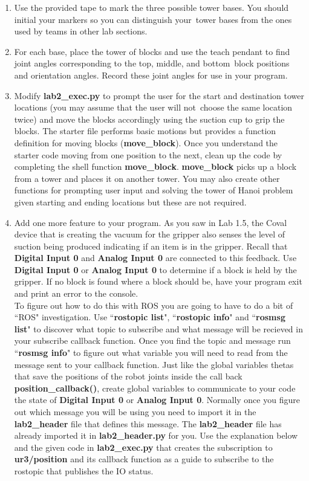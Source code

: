 \begin{enumerate}
\item Use the provided tape to mark the three possible tower bases.  You should initial your markers so you can distinguish your\
tower bases from the ones used by teams in other lab sections.
\item For each base, place the tower of blocks and use the teach pendant to find joint angles corresponding to the top, middle, and bottom\
block positions and orientation angles.  Record these joint angles for use in your program.
\item Modify \textbf{lab2\_exec.py} to prompt the user for the start and destination tower locations (you may assume that the user will not\
choose the same location twice) and move the blocks accordingly using the suction cup to grip the blocks.  The starter file performs basic motions 
but provides a function definition for moving blocks (\textbf{move\_block}). Once you understand
the starter code moving from one position to the next, clean up the code by completing the shell function \textbf{move\_block}.  
\textbf{move\_block} picks up a block from a tower and places it on another tower. You may also create other functions for prompting
user input and solving the tower of Hanoi problem given starting and ending locations but these are not required.  
\item Add one more feature to your program.  As you saw in Lab 1.5, the Coval device that is creating the vacuum for the gripper also senses
the level of suction being produced indicating if an item is in the gripper.  Recall that \textbf{Digital Input 0} and \textbf{Analog Input 0} are connected to
this feedback.  Use \textbf{Digital Input 0} or \textbf{Analog Input 0} to determine if a block is held by the gripper.  If no block is found where a block should be,
have your program exit and print an error to the console.\\
To figure out how to do this with ROS you are going to have to do a bit of ``ROS" investigation.  Use ``\textbf{rostopic list}", ``\textbf{rostopic info}" and ``\textbf{rosmsg list}" to discover
what topic to subscribe and what message will be recieved in your subscribe callback function.  Once you find the topic and message run ``\textbf{rosmsg info}"
to figure out what variable you will need to read from the message sent to your callback function.  Just like the global variables thetas that
save the positions of the robot joints inside the call back \textbf{position\_callback()}, create global variables
to communicate to your code the state of \textbf{Digital Input 0} or \textbf{Analog Input 0}.  Normally once you figure out which message you will be using 
you need to import it in the \textbf{lab2\_header} file that defines this message.  The \textbf{lab2\_header} file has already imported it in \textbf{lab2\_header.py} for you.  Use the explanation below
and the given code in \textbf{lab2\_exec.py} that creates the subscription to \textbf{ur3/position} and its callback function as a guide to subscribe to the rostopic
that publishes the IO status.     

\end{enumerate}

